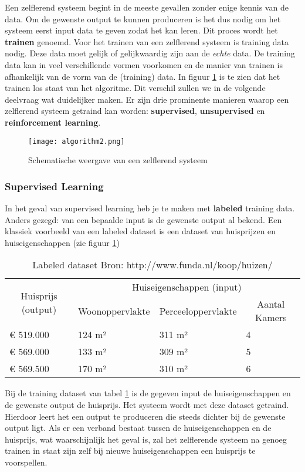 Een zelflerend systeem begint in de meeste gevallen zonder enige kennis van de data. Om de gewenste output te kunnen produceren is het dus nodig om het systeem eerst input data te geven zodat het kan leren. Dit proces wordt het \textbf{trainen} genoemd. Voor het trainen van een zelflerend systeem is training data nodig. Deze data moet gelijk of gelijkwaardig zijn aan de \textit{echte} data. De training data kan in veel verschillende vormen voorkomen en de manier van trainen is afhankelijk van de vorm van de (training) data. In figuur \ref{fig:algorithm2}  is te zien dat het trainen los staat van het algoritme. Dit verschil zullen we in de volgende deelvraag wat duidelijker maken. 
Er zijn drie prominente manieren waarop een zelflerend systeem getraind kan worden: \textbf{supervised}, \textbf{unsupervised} en \textbf{reinforcement learning}.

\begin{figure}[H]
  \centering
    \texttt{[image: algorithm2.png]}
  \caption{Schematische weergave van een zelflerend systeem}
  \label{fig:algorithm2}
\end{figure}

\subsubsection{Supervised Learning}
In het geval van supervised learning heb je te maken met \textbf{labeled} training data. Anders gezegd: van een bepaalde input is de gewenste output al bekend. Een klassiek voorbeeld van een labeled dataset is een dataset van huisprijzen en huiseigenschappen (zie figuur \ref{fig:LabeledDataset})

\begin{table}[h]
\centering
\begin{tabular}{llll}
\hline
\multicolumn{1}{c}{\multirow{2}{*}{Huisprijs (output)}} & \multicolumn{3}{c}{Huiseigenschappen (input)} \\
\multicolumn{1}{c}{} & \multicolumn{1}{c}{Woonoppervlakte} & \multicolumn{1}{c}{Perceeloppervlakte} & \multicolumn{1}{c}{Aantal Kamers} \\ \hline
€ 519.000 & 124 m² & 311 m² & 4 \\
€ 569.000 & 133 m² & 309 m² & 5 \\
€ 569.500 & 170 m² & 310 m² & 6 \\ \hline
\end{tabular}
\caption{Labeled dataset Bron: http://www.funda.nl/koop/huizen/ }
\label{fig:LabeledDataset}
\end{table}
Bij de training dataset van tabel \ref{fig:LabeledDataset} is de gegeven input de huiseigenschappen en de gewenste output de huisprijs. Het systeem wordt met deze dataset getraind. Hierdoor leert het een output te produceren die steeds dichter bij de gewenste output ligt. Als er een verband bestaat tussen de huiseigenschappen en de huisprijs, wat waarschijnlijk het geval is, zal het zelflerende systeem na genoeg trainen in staat zijn zelf bij nieuwe huiseigenschappen een huisprijs te voorspellen. \cite{MLCourse1}

